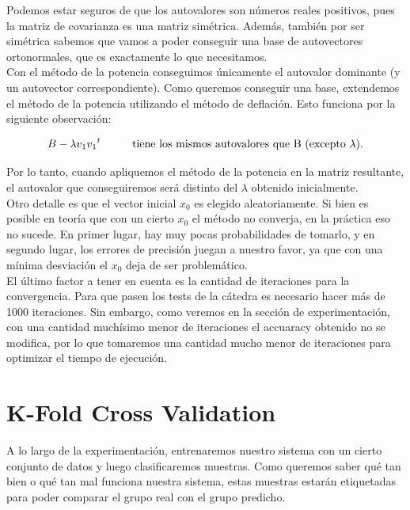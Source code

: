 Podemos estar seguros de que los autovalores son números reales positivos, pues la matriz de covarianza es una matriz simétrica. Además, también por ser simétrica sabemos que vamos a poder conseguir una base de autovectores ortonormales, que es exactamente lo que necesitamos. \\

Con el método de la potencia conseguimos únicamente el autovalor dominante (y un autovector correspondiente). Como queremos conseguir una base, extendemos el método de la potencia utilizando el método de deflación. Esto funciona por la siguiente observación:

$$ B - \lambda v_1 {v_1}^{t} \text{\hspace{1cm}tiene los mismos autovalores que B (excepto $\lambda$).} $$

Por lo tanto, cuando apliquemos el método de la potencia en la matriz resultante, el autovalor que conseguiremos será distinto del $\lambda$ obtenido inicialmente. \\

Otro detalle es que el vector inicial $x_0$ es elegido aleatoriamente. Si bien es posible en teoría que con un cierto $x_0$ el método no converja, en la práctica eso no sucede. En primer lugar, hay muy pocas probabilidades de tomarlo, y en segundo lugar, los errores de precisión juegan a nuestro favor, ya que con una mínima desviación el $x_0$ deja de ser problemático. \\

El último factor a tener en cuenta es la cantidad de iteraciones para la convergencia. Para que pasen los tests de la cátedra es necesario hacer más de 1000 iteraciones. Sin embargo, como veremos en la sección de experimentación, con una cantidad muchísimo menor de iteraciones el accuaracy obtenido no se modifica, por lo que tomaremos una cantidad mucho menor de iteraciones para optimizar el tiempo de ejecución. \\

\section{K-Fold Cross Validation}

A lo largo de la experimentación, entrenaremos nuestro sistema con un cierto conjunto de datos y luego clasificaremos muestras. Como queremos saber qué tan bien o qué tan mal funciona nuestra sistema, estas muestras estarán etiquetadas para poder comparar el grupo real con el grupo predicho. \\

